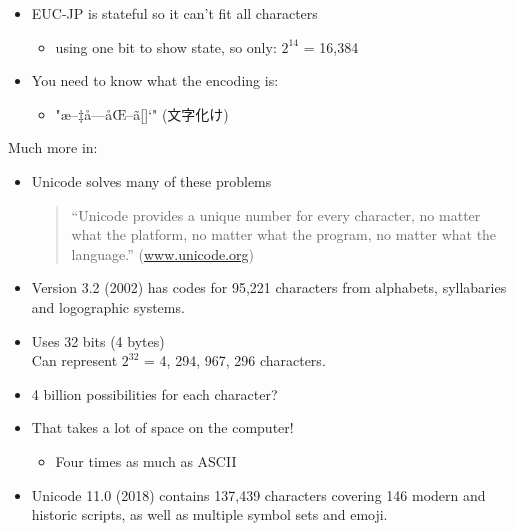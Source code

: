 \documentclass[a4paper,landscape,headrule,footrule,xetex]{foils}
\begin{document}
\begin{itemize}
\item EUC-JP is stateful so it can't fit all characters
  \begin{itemize}
  \item using one bit to show state, so only: $2^{14}$ = 16,384
  \end{itemize}
\item You need to know what the encoding is:
\begin{itemize}
\item "æ–‡å­—åŒ–ã[]‘" (文字化け)
\end{itemize}
\end{itemize}

\noindent Much more in: \\


\begin{itemize}
\item Unicode solves many of these problems
  \begin{quote}
    “Unicode provides a unique number for every character, no matter what the platform, no matter what the program, no matter what the language.” (\url{www.unicode.org})
\end{quote}
\end{itemize}




\begin{itemize}
\item Version 3.2 (2002) has codes for 95,221 characters from alphabets, syllabaries and logographic systems.
\item Uses 32 bits (4 bytes) 
  \\ Can represent $2^{32}$ = 4, 294, 967, 296 characters.
\item 4 billion possibilities for each character?
\item That takes a lot of space on the computer!
  \begin{itemize}
  \item Four times as much as ASCII
  \end{itemize}
\item Unicode 11.0 (2018) contains 137,439 characters
  covering 146 modern and historic scripts, as well as multiple symbol
  sets and emoji.
\end{itemize}

\end{document}
